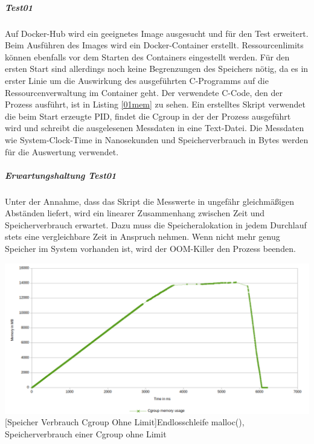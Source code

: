 \subparagraph{Test01}
Auf Docker-Hub wird ein geeignetes Image ausgesucht und für den Test erweitert. Beim Ausführen des Images wird ein Docker-Container erstellt. Ressourcenlimits können ebenfalls vor dem Starten des Containers eingestellt werden. Für den ersten Start sind allerdings noch keine Begrenzungen des Speichers nötig, da es in erster Linie um die Auswirkung des ausgeführten C-Programms auf die Ressourcenverwaltung im Container geht. Der verwendete C-Code, den der Prozess ausführt, ist in Listing \ref{01mem} zu sehen. Ein erstelltes Skript verwendet die beim Start erzeugte PID, findet die Cgroup in der der Prozess ausgeführt wird und schreibt die ausgelesenen Messdaten in eine Text-Datei. Die Messdaten wie System-Clock-Time in Nanosekunden und Speicherverbrauch in Bytes werden für die Auswertung verwendet.


\vspace{1em}


\subparagraph{Erwartungshaltung Test01}
Unter der Annahme, dass das Skript die Messwerte in ungefähr gleichmäßigen Abständen liefert, wird ein linearer Zusammenhang zwischen Zeit und Speicherverbrauch erwartet. Dazu muss die Speicheralokation in jedem Durchlauf stets eine vergleichbare Zeit in Anspruch nehmen. Wenn nicht mehr genug Speicher im System vorhanden ist, wird der OOM-Killer den Prozess beenden.

\vspace{2em}
\begin{minipage}{\linewidth}
	\centering
	\includegraphics[width=1\linewidth]{pics/001_mem_usage_No_Limit_Cgroup_RDY_FOR_USE.png}
	[Speicher Verbrauch Cgroup Ohne Limit]{Endlosschleife malloc(), Speicherverbrauch einer Cgroup ohne Limit}
	\label{fig:001_mem_usage_No_Limit_Cgroup_RDY_FOR_USE}
\end{minipage}


